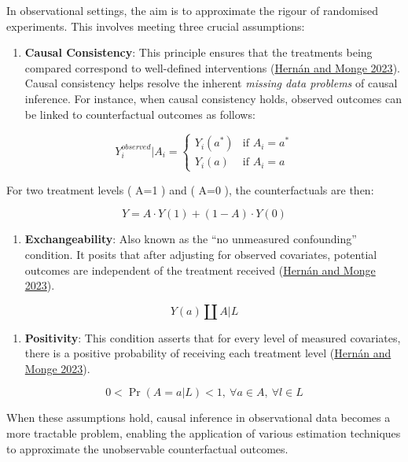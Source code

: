 \documentclass[
  singlecolumn]{article}
\providecommand{\tightlist}{%
  \setlength{\itemsep}{0pt}\setlength{\parskip}{0pt}}\usepackage{longtable,booktabs,array}
\begin{document}
In observational settings, the aim is to approximate the rigour of
randomised experiments. This involves meeting three crucial assumptions:

\begin{enumerate}
\def\labelenumi{\arabic{enumi}.}
\tightlist
\item
  \textbf{Causal Consistency}: This principle ensures that the
  treatments being compared correspond to well-defined interventions
  (\hyperref[ref-hernuxe1n2023]{Hernán and Monge 2023}). Causal
  consistency helps resolve the inherent \emph{missing data problems} of
  causal inference. For instance, when causal consistency holds,
  observed outcomes can be linked to counterfactual outcomes as follows:
\end{enumerate}

\[
Y_i^{observed}|A_i = 
\begin{cases} 
Y_i(a^*) & \text{if } A_i = a^* \\
Y_i(a) & \text{if } A_i = a
\end{cases}
\]

For two treatment levels ( A=1 ) and ( A=0 ), the counterfactuals are
then:

\[
Y = A \cdot Y(1) + (1-A) \cdot Y(0)
\]

\begin{enumerate}
\def\labelenumi{\arabic{enumi}.}
\setcounter{enumi}{1}
\tightlist
\item
  \textbf{Exchangeability}: Also known as the ``no unmeasured
  confounding'' condition. It posits that after adjusting for observed
  covariates, potential outcomes are independent of the treatment
  received (\hyperref[ref-hernuxe1n2023]{Hernán and Monge 2023}).
\end{enumerate}

\[
Y(a) \coprod  A|L
\]

\begin{enumerate}
\def\labelenumi{\arabic{enumi}.}
\setcounter{enumi}{2}
\tightlist
\item
  \textbf{Positivity}: This condition asserts that for every level of
  measured covariates, there is a positive probability of receiving each
  treatment level (\hyperref[ref-hernuxe1n2023]{Hernán and Monge 2023}).
\end{enumerate}

\[
0 < \Pr(A=a|L)<1, ~ \forall a \in A, ~ \forall l \in L
\]

When these assumptions hold, causal inference in observational data
becomes a more tractable problem, enabling the application of various
estimation techniques to approximate the unobservable counterfactual
outcomes.
\end{document}
